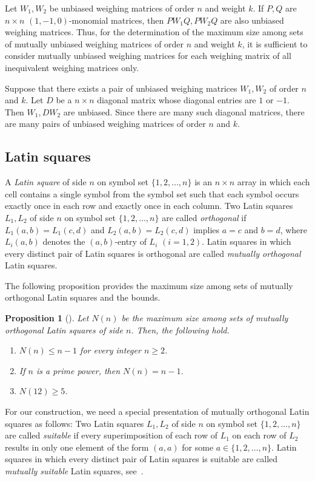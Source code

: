 \documentclass[12pt]{article}
\newtheorem{prop}[thm]{Proposition}
\theoremstyle{remark}
\begin{document}
Let $W_1,W_2$ be unbiased weighing matrices of order $n$ and weight $k$.
If $P,Q$ are $n \times n$ $(1,-1,0)$-monomial matrices, then
$PW_1Q, PW_2Q$ are also unbiased weighing matrices.
Thus, for the determination of the maximum size among sets of mutually
unbiased weighing matrices of order $n$ and weight $k$, 
it is sufficient to consider mutually
unbiased weighing matrices for each weighing matrix of all inequivalent weighing matrices only.

Suppose that there exists a pair of unbiased weighing matrices $W_1, W_2$ of order $n$ and $k$.
Let $D$ be a $n \times n$ diagonal matrix whose diagonal entries are $1$ or $-1$.
Then $W_1, DW_2$ are unbiased.
Since there are many such diagonal matrices, there are many pairs of unbiased weighing matrices
of order $n$ and $k$.

\subsection{Latin squares}

A \emph{Latin square} of side $n$ on symbol set $\{1,2,\ldots,n\}$ is an $n \times n$
array in which 
each cell contains a single symbol from the symbol set such that each symbol occurs
exactly once in each row and exactly once in each column.
Two Latin squares $L_1, L_2$ of side $n$ on symbol set $\{1,2,\ldots,n\}$
are called \emph{orthogonal} if 
$L_1(a,b)=L_1(c,d)$ and 
$L_2(a,b)=L_2(c,d)$ implies $a=c$ and $b=d$, where $L_i(a,b)$ denotes
the $(a,b)$-entry of $L_i$ $(i=1,2)$.
Latin squares in which every distinct pair of Latin squares is orthogonal are called 
\emph{mutually orthogonal} Latin squares. 

The following proposition provides 
the maximum size among sets of mutually 
orthogonal Latin squares and the bounds. 
\begin{prop}[{\cite[Theorems~3.25, 3.28, 3.44]{JACD}}]\label{prop:latin}
Let $N(n)$ be 
the maximum size among sets of mutually orthogonal Latin squares of side $n$. 
Then, the following hold.
\begin{enumerate}
\item $N(n)\leq n-1$ for every integer $n \ge 2$. 
\item  If $n$ is a prime power, then $N(n)=n-1$. 
\item $N(12)\geq 5$. 
\end{enumerate}
\end{prop} 

For our construction, we need a special presentation of mutually 
orthogonal Latin squares as follows:
Two Latin squares $L_1, L_2$ of side $n$ on symbol set $\{1,2,\ldots,n\}$
are called \emph{suitable} if every superimposition
of each row of $L_1$ on each row of $L_2$ results in only one element of the form 
$(a, a)$ for some $a \in \{1,2,\ldots,n\}$.
Latin squares in which every distinct pair of Latin squares is suitable are called 
\emph{mutually suitable} Latin squares, see~\cite[Lemma~2.3]{HKO}.
\end{document}
